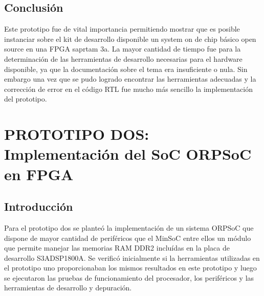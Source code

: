 		\subsection{Conclusión}
Este prototipo fue de vital importancia permitiendo mostrar que es posible instanciar sobre el kit de desarrollo disponible un system on de chip básico open source en una FPGA saprtam 3a.
La mayor cantidad de tiempo fue para la  determinación de las herramientas de desarrollo necesarias para el hardware disponible, ya que la documentación sobre el tema era insuficiente o nula. Sin embargo una vez que se pudo logrado encontrar las herramientas adecuadas y  la corrección de error en el código RTL fue mucho más sencillo la implementación del prototipo.
		
\newpage
		
	\section{PROTOTIPO DOS: Implementación del SoC ORPSoC en FPGA}
		\subsection{Introducción}
		Para el prototipo dos se planteó la implementación de un sistema ORPSoC que dispone de mayor cantidad de periféricos que el MinSoC entre ellos un
		módulo que permite manejar las memorias RAM DDR2 incluídas en la placa de desarrollo S3ADSP1800A. Se verificó inicialmente si la herramientas
		utilizadas en el prototipo uno proporcionaban los mismos resultados en este prototipo y luego se ejecutaron las pruebas de funcionamiento del
		procesador, los periféricos y las herramientas de desarrollo y depuración. 
		
